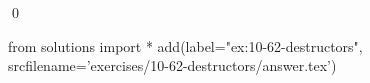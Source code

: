 
\begin{ex}
  \label{ex:10-62-destructors}
  
  \qed
\end{ex}
\begin{python0}
from solutions import *
add(label="ex:10-62-destructors",
    srcfilename='exercises/10-62-destructors/answer.tex')
\end{python0}
